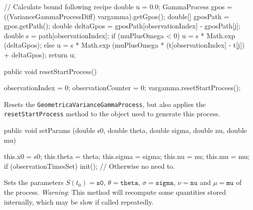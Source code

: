 \begin{hide}
\begin{code}
{        // Calculate bound following recipe
        double u = 0.0;
        GammaProcess gpos = ((VarianceGammaProcessDiff) vargamma).getGpos();
        double[] gposPath = gpos.getPath();
        double deltaGpos = gposPath[observationIndex] - gposPath[j];
        double s = path[observationIndex];
        if (muPlusOmega < 0)
             u = s * Math.exp (deltaGpos);
        else u = s * Math.exp (muPlusOmega * (t[observationIndex] - t[j])
                               + deltaGpos);
        return u;
    }
\end{code}
\end{hide}\begin{code}

   public void resetStartProcess() \begin{hide} {
        observationIndex   = 0;
        observationCounter = 0;
        vargamma.resetStartProcess();
    }\end{hide}
\end{code}
\begin{tabb} Resets the \texttt{GeometricaVarianceGammaProcess},
but also applies the \texttt{resetStartProcess} method to the
 object used to generate this process.
\end{tabb}
\begin{code}

   public void setParams (double s0, double theta, double sigma, double nu,
                          double mu) \begin{hide} {
        this.x0    = s0;
        this.theta = theta;
        this.sigma = sigma;
        this.nu    = nu;
        this.mu    = mu;
        if (observationTimesSet) init(); // Otherwise no need to.
    }\end{hide}
\end{code}
\begin{tabb}
Sets the parameters
$S(t_{0}) = \texttt{s0}$, $\theta = \texttt{theta}$, $\sigma = \texttt{sigma}$,
$\nu = \texttt{nu}$ and $\mu = \texttt{mu}$ of the process.
\emph{Warning}: This method will recompute some quantities stored internally,
which may be slow if called repeatedly.
\end{tabb}
